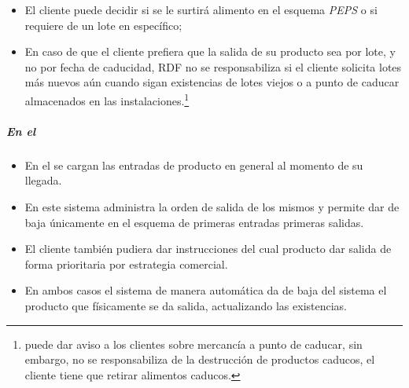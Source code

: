 \begin{note} \label{nota:PEPS}
\begin{itemize}
		\item El cliente puede decidir si se le surtirá \gls{alimento} en el esquema \emph{PEPS} o si requiere de un lote en específico;
		\item En caso de que el cliente prefiera que la salida de su producto sea por lote, y no por fecha de caducidad, \gls{RDF} no se responsabiliza si el cliente solicita lotes más nuevos aún cuando sigan existencias de lotes viejos o a punto de caducar almacenados en las instalaciones.\footnote{ puede dar aviso a los clientes sobre mercancía a punto de caducar, sin embargo,  no se responsabiliza de la destrucción de productos caducos, el cliente tiene que retirar \glspl{alimento} caducos.}
\end{itemize}
\end{note}


\subparagraph{En el }

\begin{itemize}
	\item En el  se cargan las entradas de producto en general al momento de su llegada.
	\item En este sistema administra la orden de salida de los mismos y permite dar de baja únicamente en el esquema de primeras entradas primeras salidas.
	\item El cliente también pudiera dar instrucciones del cual producto dar salida de forma prioritaria por estrategia comercial.
	\item En ambos casos el sistema de manera automática da de baja del sistema el producto que físicamente se da salida, actualizando las existencias.
\end{itemize}


